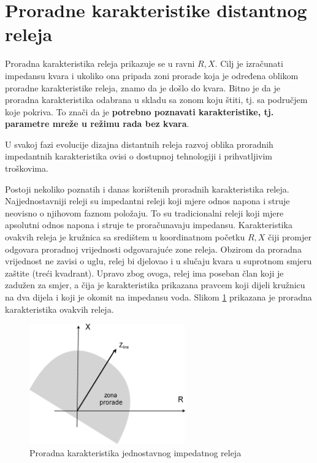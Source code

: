 \section{Proradne karakteristike distantnog releja}

Proradna karakteristika releja prikazuje se u ravni ${R,X}$. Cilj je izračunati impedansu kvara i ukoliko ona pripada zoni prorade koja je određena oblikom proradne karakteristike releja, znamo da je došlo do kvara. Bitno je da je proradna karakteristika odabrana u skladu sa zonom koju štiti, tj. sa područjem koje pokriva. To znači da je \textbf{potrebno poznavati karakteristike, tj. parametre mreže u režimu rada bez kvara}. 

U svakoj fazi evolucije dizajna distantnih releja razvoj oblika proradnih impedantnih karakteristika ovisi o dostupnoj tehnologiji i prihvatljivim troškovima.

Postoji nekoliko poznatih i danas korištenih proradnih karakteristika releja. Najjednostavniji releji su impedantni releji koji mjere odnos napona i struje neovisno o njihovom faznom položaju. To su tradicionalni releji koji mjere apsolutni odnos napona i struje te proračunavaju impedansu. Karakteristika ovakvih releja je kružnica sa središtem u koordinatnom početku ${R,X}$ čiji promjer odgovara proradnoj vrijednosti odgovarajuće zone releja. Obzirom da proradna vrijednost ne zavisi o uglu, relej bi djelovao i u slučaju kvara u suprotnom smjeru zaštite (treći kvadrant). Upravo zbog ovoga, relej ima poseban član koji je zadužen za smjer, a čija je karakteristika prikazana pravcem koji dijeli kružnicu na dva dijela i koji je okomit na impedansu voda. Slikom \ref{fig:slika1} prikazana je proradna karakteristika ovakvih releja. 

\begin{figure}[H]
  \centering
  \includegraphics[width=0.6\textwidth]{slika1}
  \caption{Proradna karakteristika jednostavnog impedatnog releja}
  \label{fig:slika1}
\end{figure}

